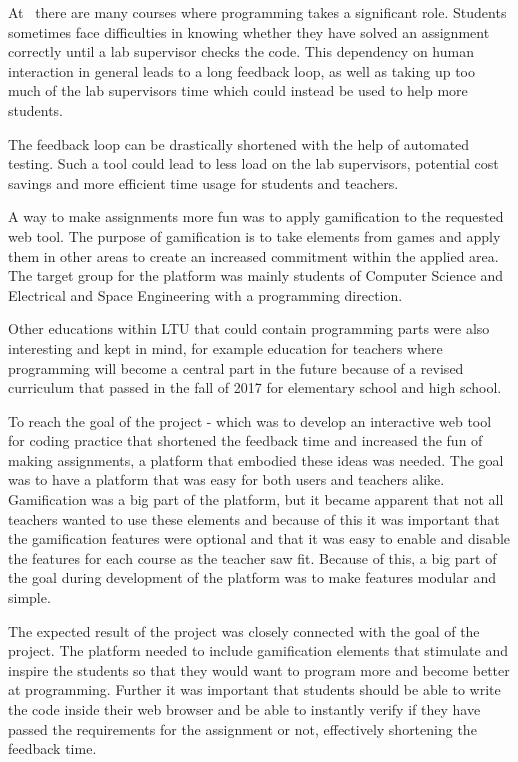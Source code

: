 At \LTU\ there are many courses where programming takes a significant role. Students sometimes face difficulties in knowing whether they have solved an assignment correctly until a lab supervisor checks the code. This dependency on human interaction in general leads to a long feedback loop, as well as taking up too much of the lab supervisors time which could instead be used to help more students. 

The feedback loop can be drastically shortened with the help of automated testing. Such a tool could lead to less load on the lab supervisors, potential cost savings and more efficient time usage for students and teachers.

A way to make assignments more fun was to apply gamification to the requested web tool. The purpose of gamification is to take elements from games and apply them in other areas to create an increased commitment within the applied area. The target group for the platform was mainly students of Computer Science and Electrical and Space Engineering with a programming direction.

Other educations within LTU that could contain programming parts were also interesting and kept in mind, for example education for teachers where programming will become a central part in the future because of a revised curriculum that passed in the fall of 2017 for elementary school and high school.

To reach the goal of the project - which was to develop an interactive web tool for coding practice that shortened the feedback time and increased the fun of making assignments, a platform that embodied these ideas was needed. The goal was to have a platform that was easy for both users and teachers alike. Gamification was a big part of the platform, but it became apparent that not all teachers wanted to use these elements and because of this it was important that the gamification features were optional and that it was easy to enable and disable the features for each course as the teacher saw fit. Because of this, a big part of the goal during development of the platform was to make features modular and simple.

The expected result of the project was closely connected with the goal of the project. The platform needed to include gamification elements that stimulate and inspire the  students so that they would want to program more and become better at programming. Further it was important that students should be able to write the code inside their web browser and be able to instantly verify if they have passed the requirements for the assignment or not, effectively shortening the feedback time.

